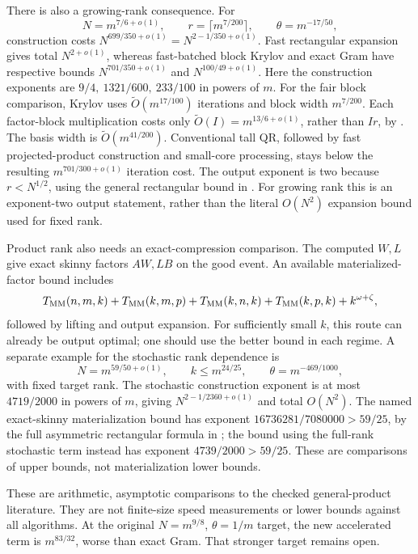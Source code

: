 \documentclass[11pt]{article}
\newcommand{\MM}{T_{\rm MM}}
\begin{document}
There is also a growing-rank consequence. For
\[
 N=m^{7/6+o(1)},\qquad r=\lceil m^{7/200}\rceil,\qquad
 \theta=m^{-17/50},
\]
construction costs \(N^{699/350+o(1)}=N^{2-1/350+o(1)}\).
Fast rectangular expansion gives total \(N^{2+o(1)}\), whereas
fast-batched block Krylov and exact Gram have respective bounds
\(N^{701/350+o(1)}\) and \(N^{100/49+o(1)}\).
Here the construction exponents are
\(9/4,\ 1321/600,\ 233/100\) in powers of \(m\).
For the fair block comparison, Krylov uses
\(\widetilde O(m^{17/100})\) iterations and block width \(m^{7/200}\).
Each factor-block multiplication costs only
\(\widetilde O(I)=m^{13/6+o(1)}\), rather than \(Ir\), by
\cite{amanov}. The basis width is \(\widetilde O(m^{41/200})\).
Conventional tall QR, followed by fast projected-product construction
and small-core processing, stays below the resulting
\(m^{701/300+o(1)}\) iteration cost.
The output exponent is two because \(r<N^{1/2}\), using the
general rectangular bound in \cite{amanov}.
For growing rank this is an exponent-two output statement, rather
than the literal \(O(N^2)\) expansion bound used for fixed rank.

Product rank also needs an exact-compression comparison.
The computed \(W,L\) give exact skinny factors \(AW,LB\) on the
good event. An available materialized-factor bound includes
\[
 \MM(n,m,k)+\MM(k,m,p)+\MM(k,n,k)+\MM(k,p,k)+k^{\omega+\zeta},
\]
followed by lifting and output expansion.
For sufficiently small \(k\), this route can already be output optimal;
one should use the better bound in each regime.
A separate example for the stochastic rank dependence is
\[
 N=m^{59/50+o(1)},\qquad k\leq m^{24/25},\qquad
 \theta=m^{-469/1000},
\]
with fixed target rank. The stochastic construction exponent is at
most \(4719/2000\) in powers of \(m\), giving
\(N^{2-1/2360+o(1)}\) and total \(O(N^2)\).
The named exact-skinny materialization bound has exponent
\(16736281/7080000>59/25\), by the full asymmetric rectangular
formula in \cite{amanov}; the bound using the full-rank stochastic
term instead has exponent \(4739/2000>59/25\).
These are comparisons of upper bounds, not materialization lower bounds.

These are arithmetic, asymptotic comparisons to the checked
general-product literature. They are not finite-size speed measurements
or lower bounds against all algorithms.
At the original \(N=m^{9/8}\), \(\theta=1/m\) target, the new
accelerated term is \(m^{83/32}\), worse than exact Gram.
That stronger target remains open.
\end{document}
